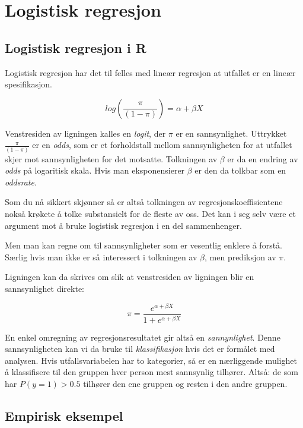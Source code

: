 \documentclass[
  letterpaper,
  DIV=11,
  numbers=noendperiod]{scrreprt}
\theoremstyle{definition}
\theoremstyle{remark}
\begin{document}

\hypertarget{logistisk-regresjon}{%
\chapter{Logistisk regresjon}\label{logistisk-regresjon}}

\hypertarget{logistisk-regresjon-i-r}{%
\section{Logistisk regresjon i R}\label{logistisk-regresjon-i-r}}

Logistisk regresjon har det til felles med lineær regresjon at utfallet
er en lineær spesifikasjon.

\[  log( \frac{\pi}{(1-\pi)}) = \alpha + \beta X \]

Venstresiden av ligningen kalles en \emph{logit}, der \(\pi\) er en
sannsynlighet. Uttrykket \(\frac{\pi}{(1-\pi)}\) er en \emph{odds}, som
er et forholdstall mellom sannsynligheten for at utfallet skjer mot
sannsynligheten for det motsatte. Tolkningen av \(\beta\) er da en
endring av \emph{odds} på logaritisk skala. Hvis man eksponensierer
\(\beta\) er den da tolkbar som en \emph{oddsrate}.

Som du nå sikkert skjønner så er altså tolkningen av
regresjonskoeffisientene nokså krøkete å tolke substansielt for de
fleste av oss. Det kan i seg selv være et argument mot å bruke logistisk
regresjon i en del sammenhenger.

Men man kan regne om til sannsynligheter som er vesentlig enklere å
forstå. Særlig hvis man ikke er så interessert i tolkningen av
\(\beta\), men prediksjon av \(\pi\).

Ligningen kan da skrives om slik at venstresiden av ligningen blir en
sannsynlighet direkte:

\[  \pi = \frac{e^{\alpha + \beta X}}{1 + e^{\alpha + \beta X}} \]

En enkel omregning av regresjonsresultatet gir altså en
\emph{sannynlighet}. Denne sannsynligheten kan vi da bruke til
\emph{klassifikasjon} hvis det er formålet med analysen. Hvis
utfallsvariabelen har to kategorier, så er en nærliggende mulighet å
klassifisere til den gruppen hver person mest sannsynlig tilhører.
Altså: de som har \(P(y = 1) > 0.5\) tilhører den ene gruppen og resten
i den andre gruppen.

\hypertarget{empirisk-eksempel}{%
\section{Empirisk eksempel}\label{empirisk-eksempel}}
\end{document}
